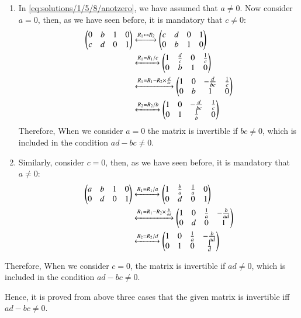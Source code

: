 \begin{enumerate}
\item
In \eqref{eq:solutions/1/5/8/anotzero}, we have assumed that $a \neq 0$. Now consider $a = 0$, then, as we have seen before, it is mandatory that $c \neq 0$:
\begin{align}
    \begin{pmatrix}0 & b & 1 & 0 \\ c & d & 0 & 1\end{pmatrix} &\xleftrightarrow{R_1\leftrightarrow R_2}  \begin{pmatrix}c & d & 0 & 1 \\ 0 & b & 1 & 0\end{pmatrix} \\
    &\xleftrightarrow{R_1 = R_1/c}\begin{pmatrix}1 & \frac{d}{c} & 0 & \frac{1}{c} \\ 0 & b & 1 & 0\end{pmatrix}  \nonumber \\
    &\xleftrightarrow{R_1 = R_1 - R_2\times \frac{d}{bc}}\begin{pmatrix}1 & 0 & -\frac{d}{bc} & \frac{1}{c} \\ 0 & b & 1 & 0\end{pmatrix}\nonumber\\
    &\xleftrightarrow{R_2 = R_2/b}\begin{pmatrix}1 & 0 & -\frac{d}{bc} & \frac{1}{c} \\ 0 & 1 & \frac{1}{b} & 0\end{pmatrix} \nonumber
\end{align}
Therefore, When we consider $a=0$ the matrix is invertible if $bc\neq0$, which is included in the condition $ad-bc\neq0$. 
\item Similarly, consider $c=0$, then, as we have seen before, it is mandatory that $a\neq0$:
\begin{align}
     \begin{pmatrix}a & b & 1 & 0 \\ 0 & d & 0 & 1\end{pmatrix} &\xleftrightarrow{R_1 = R_1/a}\begin{pmatrix}1 & \frac{b}{a} & \frac{1}{a} & 0 \\ 0 & d & 0 & 1\end{pmatrix}\\
     &\xleftrightarrow{R_1 = R_1 - R_2\times\frac{b}{ad}}\begin{pmatrix}1 & 0 & \frac{1}{a} & -\frac{b}{ad} \\ 0 & d & 0 & 1\end{pmatrix}\nonumber\\
     &\xleftrightarrow{R_2 = R_2/d}\begin{pmatrix}1 & 0 & \frac{1}{a} & -\frac{b}{ad} \\ 0 & 1 & 0 & \frac{1}{d}\end{pmatrix} \nonumber
\end{align}
\end{enumerate}
Therefore, When we consider $c=0$, the matrix is invertible if $ad\neq0$, which is included in the condition $ad-bc\neq0$.\par
Hence, it is proved from above three cases that the given matrix is invertible iff $ad - bc \neq 0$. 
